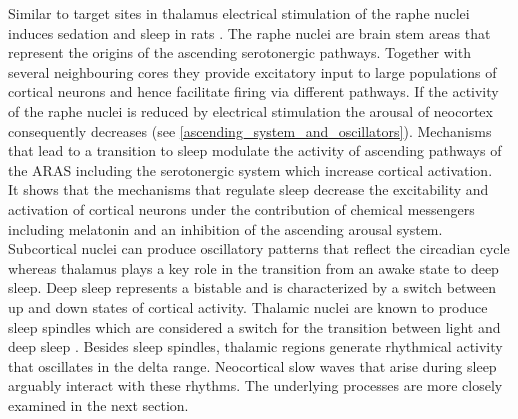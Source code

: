 Similar to target sites in thalamus electrical stimulation of the raphe nuclei induces sedation and sleep in rats \parencite{kostowski1969electrical}. The raphe nuclei are brain stem areas that represent the origins of the ascending serotonergic pathways. Together with several neighbouring cores they provide excitatory input to large populations of cortical neurons and hence facilitate firing via different pathways. If the activity of the raphe nuclei is reduced by electrical stimulation the arousal of neocortex consequently decreases (see \ref{ascending_system_and_oscillators}). Mechanisms that lead to a transition to sleep modulate the activity of ascending pathways of the ARAS including the serotonergic system which increase cortical activation.\\
It shows that the mechanisms that regulate sleep decrease the excitability and activation of cortical neurons under the contribution of chemical messengers including melatonin and an inhibition of the ascending arousal system. Subcortical nuclei can produce oscillatory patterns that reflect the circadian cycle whereas thalamus plays a key role in the transition from an awake state to deep sleep. Deep sleep represents a bistable and is characterized by a switch between up and down states of cortical activity. Thalamic nuclei are known to produce sleep spindles which are considered a switch for the transition between light and deep sleep \parencite{montagna2005fatal}. Besides sleep spindles, thalamic regions generate rhythmical activity that oscillates in the delta range. Neocortical slow waves that arise during sleep arguably interact with these rhythms. The underlying processes are more closely examined in the next section.
